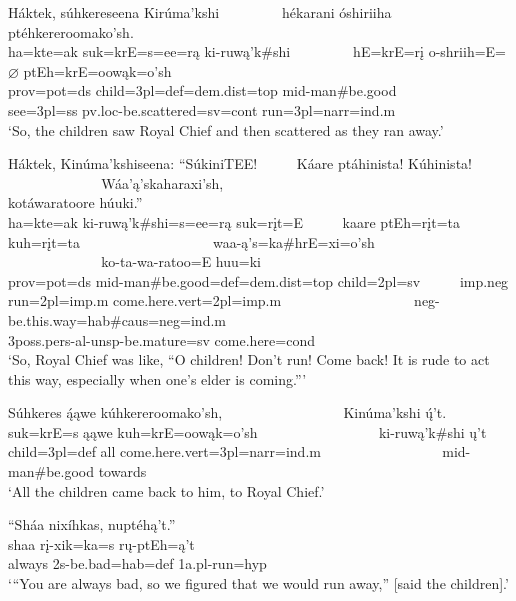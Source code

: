 \begin{exe}
\item\label{EJ6} \glll Háktek, súhkereseena Kirúma'kshi ~ ~ ~ ~ ~ hékarani óshiriiha ptéhkereroomako'sh.\\
ha=kte=ak suk=krE=s=ee=rą ki-ruwą'k\#shi ~ ~ ~ ~ ~ hE=krE=rį o-shriih=E=$\varnothing$ ptEh=krE=oowąk=o'sh\\
prov=pot=ds \textnormal{child}=3pl=def=dem.dist=top mid-\textnormal{man}\#\textnormal{be.good} ~ ~ ~ ~ ~ \textnormal{see}=3pl=ss pv.loc-\textnormal{be.scattered}=sv=cont \textnormal{run}=3pl=narr=ind.m\\
\glt `So, the children saw Royal Chief and then scattered as they ran away.'

\item\label{EJ7} \glll Háktek, Kinúma'kshiseena: ``SúkiniTEE! ~ ~ ~ Káare ptáhinista! Kúhinista! ~ ~ ~ ~ ~ ~ ~ ~ ~ ~ ~  Wáa'ą'skaharaxi'sh, ~ ~ ~ ~ ~ ~ ~ ~ ~ ~ ~ ~ ~ ~ ~ ~ ~ ~ ~ kotáwaratoore húuki.''\\
ha=kte=ak ki-ruwą'k\#shi=s=ee=rą suk=rįt=E ~ ~ ~ kaare ptEh=rįt=ta kuh=rįt=ta ~ ~ ~ ~ ~ ~ ~ ~ ~ ~ ~ waa-ą's=ka\#hrE=xi=o'sh ~ ~ ~ ~ ~ ~ ~ ~ ~ ~ ~ ~ ~ ~ ~ ~ ~ ~ ~ ko-ta-wa-ratoo=E huu=ki\\
prov=pot=ds mid-\textnormal{man}\#\textnormal{be.good}=def=dem.dist=top \textnormal{child}=2pl=sv ~ ~ ~ imp.neg \textnormal{run}=2pl=imp.m \textnormal{come.here}.vert=2pl=imp.m ~ ~ ~ ~ ~ ~ ~ ~ ~ ~ ~ neg-\textnormal{be.this.way}=hab\#caus=neg=ind.m ~ ~ ~ ~ ~ ~ ~ ~ ~ ~ ~ ~ ~ ~ ~ ~ ~ ~ ~ 3poss.pers-al-unsp-\textnormal{be.mature}=sv \textnormal{come.here}=cond\\
\glt `So, Royal Chief was like, ``O children! Don't run! Come back! It is rude to act this way, especially when one's elder is coming.{''}'

\item\label{EJ8} \glll Súhkeres ą́ąwe kúhkereroomako'sh, ~ ~ ~ ~ ~ ~ ~ ~ ~ ~ Kinúma'kshi ų́'t.\\
suk=krE=s ąąwe kuh=krE=oowąk=o'sh ~ ~ ~ ~ ~ ~ ~ ~ ~ ~ ki-ruwą'k\#shi ų't\\
\textnormal{child}=3pl=def \textnormal{all} \textnormal{come.here}.vert=3pl=narr=ind.m ~ ~ ~ ~ ~ ~ ~ ~ ~ ~ mid-\textnormal{man}\#\textnormal{be.good} \textnormal{towards}\\
\glt `All the children came back to him, to Royal Chief.'

\item\label{EJ9} \glll ``Sháa nixíhkas, nuptéhą't.''\\
shaa rį-xik=ka=s rų-ptEh=ą't\\
\textnormal{always} 2s-\textnormal{be.bad}=hab=def 1a.pl-\textnormal{run}=hyp\\
\glt `{``}You are always bad, so we figured that we would run away,{''} [said the children].'


\end{exe}
